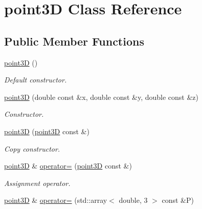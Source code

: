 \hypertarget{classpoint3D}{
\section{point3D Class Reference}
\label{classpoint3D}
}
\subsection*{Public Member Functions}
\begin{DoxyCompactItemize}
\item 
\hypertarget{classpoint3D_a81226cd006e952b1ad32fcb52836a40e}{
\hyperlink{classpoint3D_a81226cd006e952b1ad32fcb52836a40e}{point3D} ()}
\label{classpoint3D_a81226cd006e952b1ad32fcb52836a40e}

\begin{DoxyCompactList}\small\item\em Default constructor. \item\end{DoxyCompactList}\item 
\hypertarget{classpoint3D_a50e434e5f11da3498df84327397bd214}{
\hyperlink{classpoint3D_a50e434e5f11da3498df84327397bd214}{point3D} (double const \&x, double const \&y, double const \&z)}
\label{classpoint3D_a50e434e5f11da3498df84327397bd214}

\begin{DoxyCompactList}\small\item\em Constructor. \item\end{DoxyCompactList}\item 
\hypertarget{classpoint3D_a15135c3b04b83b0fa5e45802194693e8}{
\hyperlink{classpoint3D_a15135c3b04b83b0fa5e45802194693e8}{point3D} (\hyperlink{classpoint3D}{point3D} const \&)}
\label{classpoint3D_a15135c3b04b83b0fa5e45802194693e8}

\begin{DoxyCompactList}\small\item\em Copy constructor. \item\end{DoxyCompactList}\item 
\hypertarget{classpoint3D_ac343e51f2b174bea503cf3e760125579}{
\hyperlink{classpoint3D}{point3D} \& \hyperlink{classpoint3D_ac343e51f2b174bea503cf3e760125579}{operator=} (\hyperlink{classpoint3D}{point3D} const \&)}
\label{classpoint3D_ac343e51f2b174bea503cf3e760125579}

\begin{DoxyCompactList}\small\item\em Assignment operator. \item\end{DoxyCompactList}\item 
\hypertarget{classpoint3D_ab3b3a64d6164b2b20d3b4dfd72c92f44}{
\hyperlink{classpoint3D}{point3D} \& \hyperlink{classpoint3D_ab3b3a64d6164b2b20d3b4dfd72c92f44}{operator=} (std::array$<$ double, 3 $>$ const \&P)}
\label{classpoint3D_ab3b3a64d6164b2b20d3b4dfd72c92f44}


\end{DoxyCompactItemize}
